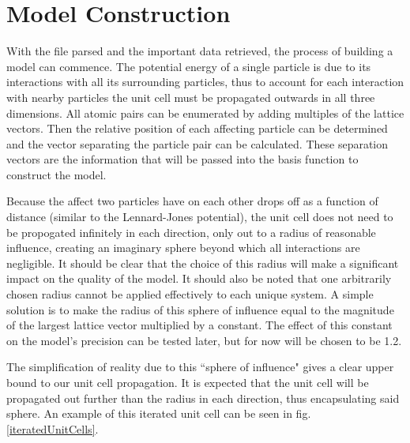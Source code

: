 \section{Model Construction}\label{Sect:procedureConstruction}
\par With the file parsed and the important data retrieved, the process of building a model can commence. The potential energy of a single particle is due to its interactions with all its surrounding particles, thus to account for each interaction with nearby particles the unit cell must be propagated outwards in all three dimensions. All atomic pairs can be enumerated by adding multiples of the lattice vectors. Then the relative position of each affecting particle can be determined and the vector separating the particle pair can be calculated. These separation vectors are the information that will be passed into the basis function to construct the model. 
\par Because the affect two particles have on each other drops off as a function of distance (similar to the Lennard-Jones potential), the unit cell does not need to be propogated infinitely in each direction, only out to a radius of reasonable influence, creating an imaginary sphere beyond which all interactions are negligible. It should be clear that the choice of this radius will make a significant impact on the quality of the model. It should also be noted that one arbitrarily chosen radius cannot be applied effectively to each unique system. A simple solution is to make the radius of this sphere of influence equal to the magnitude of the largest lattice vector multiplied by a constant. The effect of this constant on the model's precision can be tested later, but for now will be chosen to be 1.2.
\par The simplification of reality due to this ``sphere of influence" gives a clear upper bound to our unit cell propagation. It is expected that the unit cell will be propagated out further than the radius in each direction, thus encapsulating said sphere. An example of this iterated unit cell can be seen in fig. \ref{iteratedUnitCells}. 

